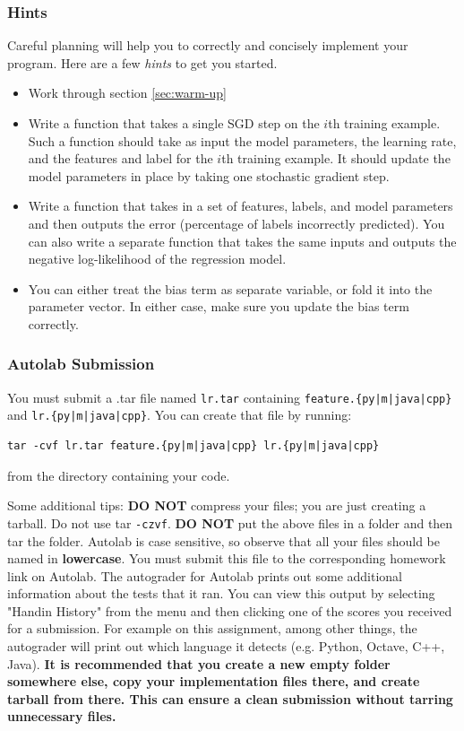 \documentclass[11pt]{article}
\numberwithin{equation}{section} %
\numberwithin{figure}{section} %
\numberwithin{table}{section} %
\begin{document}
\subsubsection{Hints}
Careful planning will help you to correctly and concisely implement your program. Here are a few \emph{hints} to get you started.
\begin{itemize}
    \item Work through section \ref{sec:warm-up}
    \item Write a function that takes a single SGD step on the $i$th training example. Such a function should take as input the model parameters, the learning rate, and the features and label for the $i$th training example. It should update the model parameters in place by taking one stochastic gradient step.
    \item Write a function that takes in a set of features, labels, and model parameters and then outputs the error (percentage of labels incorrectly predicted). You can also write a separate function that takes the same inputs and outputs the negative log-likelihood of the regression model.
    \item You can either treat the bias term as separate variable, or fold it into the parameter vector. In either case, make sure you update the bias term correctly.  
\end{itemize}

\subsubsection{Autolab Submission}

You must submit a .tar file named {\tt lr.tar} containing \texttt{feature.\{py|m|java|cpp\}} and \newline \texttt{lr.\{py|m|java|cpp\}}.
You can create that file by running:
\begin{lstlisting}
tar -cvf lr.tar feature.{py|m|java|cpp} lr.{py|m|java|cpp}
\end{lstlisting}
from the directory containing your code. 

Some additional tips: {\bf DO NOT} compress your files; you are just
creating a tarball. Do not use tar \texttt{-czvf}.  {\bf DO NOT} put
the above files in a folder and then tar the folder.  Autolab is case
sensitive, so observe that all your files should be named in {\bf
  lowercase}. You must submit this file to the corresponding homework
link on Autolab. The autograder for Autolab prints out some additional 
information about the tests that it ran. You can view this output by selecting 
 "Handin History" from the menu and then clicking one of the scores you 
 received for a submission. For example on this assignment, among other things, 
 the autograder will print out which language it detects (e.g. Python, Octave, C++, Java).  {\bf It is recommended that you create a new empty folder somewhere else, copy your implementation files there, and create tarball from there. This can ensure a clean submission without tarring unnecessary files.}
 
\end{document}
